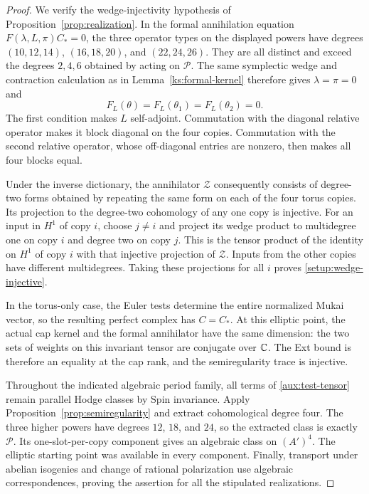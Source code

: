 \begin{proof}
We verify the wedge-injectivity hypothesis of
Proposition~\ref{prop:realization}.  In the formal
annihilation equation $F(\lambda,L,\pi)C_*=0$, the
three operator types on the displayed powers have
degrees $(10,12,14)$, $(16,18,20)$, and $(22,24,26)$.
They are all distinct and exceed the degrees $2,4,6$
obtained by acting on $\mathcal P$.  The same symplectic
wedge and contraction calculation as in
Lemma~\ref{ks:formal-kernel} therefore gives
$\lambda=\pi=0$ and
\[
 F_L(\theta)=F_L(\theta_1)=F_L(\theta_2)=0.
\]
The first condition makes $L$ self-adjoint.  Commutation
with the diagonal relative operator makes it block
diagonal on the four copies.  Commutation with the
second relative operator, whose off-diagonal entries
are nonzero, then makes all four blocks equal.

Under the inverse dictionary, the annihilator
$\mathcal Z$ consequently consists of degree-two forms
obtained by repeating the same form on each of the
four torus copies.  Its projection to the degree-two
cohomology of any one copy is injective.  For an input
in $H^1$ of copy $i$, choose $j\ne i$ and project its
wedge product to multidegree one on copy $i$ and
degree two on copy $j$.  This is the tensor product
of the identity on $H^1$ of copy $i$ with that
injective projection of $\mathcal Z$.  Inputs from
the other copies have different multidegrees.  Taking
these projections for all $i$ proves
\eqref{setup:wedge-injective}.

In the torus-only case, the Euler tests determine
the entire normalized Mukai vector, so the resulting
perfect complex has $C=C_*$.  At this elliptic point,
the actual cap kernel and the formal annihilator
have the same dimension: the two sets of weights
on this invariant tensor are conjugate over $\mathbb C$.
The Ext bound is therefore an equality at the cap
rank, and the semiregularity trace is injective.

Throughout the indicated algebraic period family,
all terms of \eqref{aux:test-tensor} remain parallel
Hodge classes by Spin invariance.  Apply
Proposition~\ref{prop:semiregularity} and extract
cohomological degree four.  The three higher powers
have degrees $12$, $18$, and $24$, so the extracted
class is exactly $\mathcal P$.  Its one-slot-per-copy
component gives an algebraic class on $(A')^4$.
The elliptic starting point was available in every
component.  Finally, transport under abelian
isogenies and change of rational polarization use
algebraic correspondences, proving the assertion
for all the stipulated realizations.
\end{proof}
